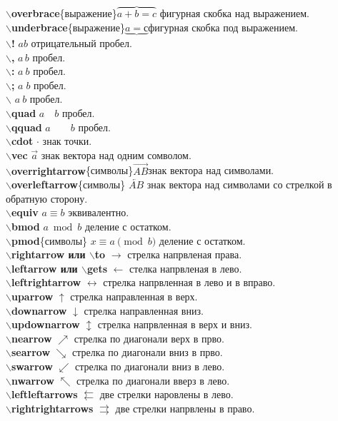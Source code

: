 \documentclass{article}
\newcommand{\bs}{$\backslash$}
\newcommand{\bd}[1]{{\bfseries #1}} %
\newcommand{\bb}[1]{\bd{\bs #1}} %
\begin{document}
\bb{overbrace}\{выражение\}$\overbrace{a+b=c}$ фигурная скобка над выражением.\\
\bb{underbrace}\{выражение\}$\underbrace{a=с}$фигурная скобка под выражением.\\
\bb{!} $a\! b$ отрицательный пробел.\\
\bb{,} $a\, b$ пробел.\\
\bb{:} $a\: b$ пробел.\\
\bb{;} $a\; b$ пробел.\\
\bb{} $a\ b$ пробел.\\
\bb{quad} $a\quad b$ пробел.\\
\bb{qquad} $a\qquad b$ пробел.\\
\bb{cdot} $\cdot$ знак точки.\\
\bb{vec} $\vec a$ знак вектора над одним сомволом.\\
\bb{overrightarrow}\{символы\}$\overrightarrow{AB}$знак вектора над символами.\\
\bb{overleftarrow}\{символы\} $\overleftarrow{AB}$ знак вектора над символами
со стрелкой в обратную сторону.\\
\bb{equiv} $a\equiv b$ эквивалентно.\\
\bb{bmod} $a \bmod b$ деление с остатком.\\
\bb{pmod}\{символы\} $x \equiv a \pmod{b}$ деление с остатком.\\
\bb{rightarrow или \bs to} $\rightarrow$ стрелка напрвленая права.\\
\bb{leftarrow или \bs gets} $\leftarrow$ стелка напрвленая в лево.\\
\bb{leftrightarrow} $\leftrightarrow$ стрелка напрвленная в лево и в вправо.\\
\bb{uparrow} $\uparrow$ стрелка направленная в верх.\\
\bb{downarrow} $\downarrow$ стрелка направленная вниз.\\
\bb{updownarrow} $\updownarrow$ стрелка напрвленная в верх и вниз.\\
\bb{nearrow} $\nearrow$ стрелка  по диагонали верх в прво.\\
\bb{searrow} $\searrow$ стрелка по диагонали вниз в прво.\\
\bb{swarrow} $\swarrow$ стрелка по диагонали вниз в лево.\\
\bb{nwarrow} $\nwarrow$ стрелка по диагонали вверз в лево.\\
\bb{leftleftarrows} $\leftleftarrows$ две стрелки наровлены в лево.\\
\bb{rightrightarrows} $\rightrightarrows$ две стрелки напрвлены в право.\\
\end{document}
